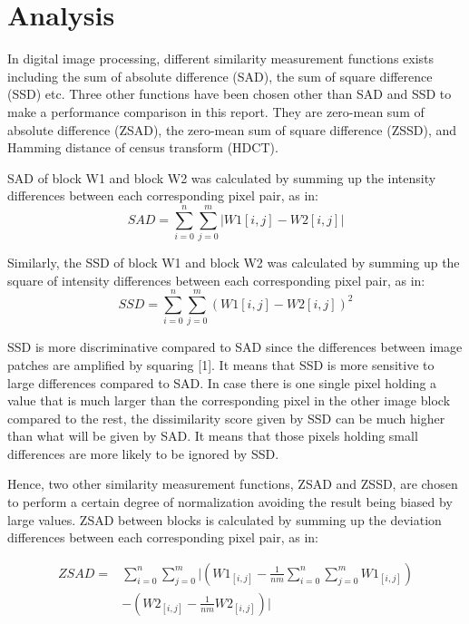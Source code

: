 \documentclass[conference]{IEEEtran}
\begin{document}
\section{Analysis}
In digital image processing, different similarity measurement functions exists including the sum of absolute difference (SAD), the sum of square difference (SSD) etc. Three other functions have been chosen other than SAD and SSD to make a performance comparison in this report. They are zero-mean sum of absolute difference (ZSAD), the zero-mean sum of square difference (ZSSD), and Hamming distance of census transform (HDCT). 

SAD of block W1 and block W2 was calculated by summing up the intensity differences between each corresponding pixel pair, as in:
\begin{equation*}
    SAD=\sum^{n}_{i=0}\sum^{m}_{j=0}|W1[i,j]-W2[i,j]|
\end{equation*}

Similarly, the SSD of block W1 and block W2 was calculated by summing up the square of intensity differences between each corresponding pixel pair, as in:
\begin{equation*}
    SSD=\sum^{n}_{i=0}\sum^{m}_{j=0}(W1[i,j]-W2[i,j])^2
\end{equation*}

SSD is more discriminative compared to SAD since the differences between image patches are amplified by squaring [1]. It means that SSD is more sensitive to large differences compared to SAD. In case there is one single pixel holding a value that is much larger than the corresponding pixel in the other image block compared to the rest, the dissimilarity score given by SSD can be much higher than what will be given by SAD. It means that those pixels holding small differences are more likely to be ignored by SSD.

Hence, two other similarity measurement functions, ZSAD and ZSSD, are chosen to perform a certain degree of normalization avoiding the result being biased by large values. ZSAD between blocks is calculated by summing up the deviation differences between each corresponding pixel pair, as in:

\begin{equation*}
    \begin{aligned}
        ZSAD= {} & \sum^{n}_{i=0}\sum^{m}_{j=0}|(W1_{[i,j]}-\frac{1}{nm}\sum^{n}_{i=0}\sum^{m}_{j=0}W1_{[i,j]})\\
        & -(W2_{[i,j]}-\frac{1}{nm}W2_{[i,j]})|
    \end{aligned}
\end{equation*}
\end{document}
